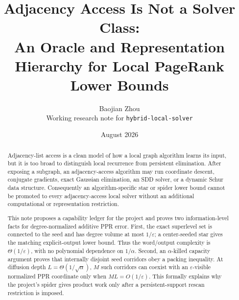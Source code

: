 \documentclass[11pt]{article}
\title{Adjacency Access Is Not a Solver Class:\\
An Oracle and Representation Hierarchy for Local PageRank Lower Bounds}
\author{Baojian Zhou\\
\small Working research note for \texttt{hybrid-local-solver}}
\date{August 2026}
\begin{document}
\maketitle

\begin{abstract}
Adjacency-list access is a clean model of how a local graph algorithm learns
its input, but it is too broad to distinguish local recurrence from persistent
elimination.  After exposing a subgraph, an adjacency-access algorithm may run
coordinate descent, conjugate gradients, exact Gaussian elimination, an SDD
solver, or a dynamic Schur data structure.  Consequently an algorithm-specific
star or spider lower bound cannot be promoted to every adjacency-access local
solver without an additional computational or representation restriction.

This note proposes a capability ledger for the project and proves two
information-level facts for degree-normalized additive PPR error.  First, the
exact superlevel set is connected to the seed and has degree volume at most
$1/\varepsilon$; a center-seeded star gives the matching explicit-output
lower bound.  Thus the word/output complexity is
$\Theta(1/\varepsilon)$, with no polynomial dependence on $1/\alpha$.
Second, an $\alpha$-killed capacity argument proves that internally disjoint
seed corridors obey a packing inequality.  At diffusion depth
$L=\Theta(1/\sqrt\alpha)$, $M$ such corridors can coexist with an
$\varepsilon$-visible normalized PPR coordinate only when
$ML=O(1/\varepsilon)$.  This formally explains why the project's spider gives
product work only after a persistent-support rescan restriction is imposed.


\end{abstract}
\end{document}
